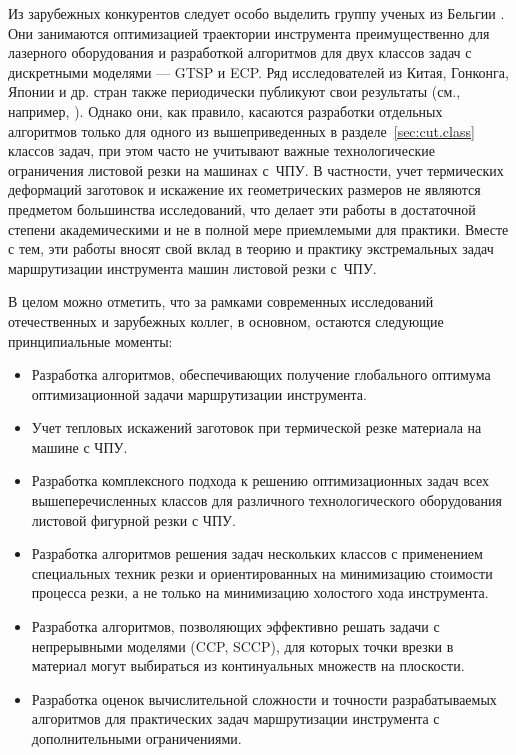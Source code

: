Из зарубежных конкурентов следует особо выделить группу ученых из Бельгии
\cite{bi:Dewil2014,bi:dewil-review,bi:Dewil2015Mar,bi:Dewil2015}.
Они занимаются
оптимизацией траектории инструмента преимущественно для лазерного оборудования и разработкой
алгоритмов для двух классов задач с дискретными моделями ---
GTSP и ECP.
Ряд исследователей из Китая, Гонконга,
Японии и др. стран также периодически публикуют свои результаты
(см., например,
\cite{bi:Kandasamy2020Mar,bi:Li2020Feb,bi:Vicencio,bi:Helsgaun2015Sep,bi:Ezzat2014Mar,bi:Ye2013,bi:Yun2013May,bi:VijayAnand2015Feb}).
Однако они, как правило,
касаются разработки отдельных алгоритмов только для одного из вышеприведенных в
разделе~\ref{sec:cut.class}
классов задач, при этом часто не учитывают важные технологические
ограничения листовой резки на машинах с~ЧПУ.
В частности, учет термических деформаций заготовок и искажение их
геометрических размеров не являются предметом большинства исследований,
что делает эти работы в достаточной степени академическими
и не в полной мере приемлемыми для практики.
Вместе с тем, эти работы вносят свой вклад в теорию и практику
экстремальных задач маршрутизации инструмента машин листовой резки с~ЧПУ.

В целом  можно отметить,
что за рамками современных исследований отечественных и зарубежных коллег,
в основном, остаются следующие принципиальные моменты:
\begin{itemize}
  \item
  Разработка алгоритмов, обеспечивающих получение глобального оптимума оптимизационной задачи маршрутизации инструмента.
  \item
  Учет тепловых искажений заготовок при термической резке материала на машине с ЧПУ.
  \item
  Разработка комплексного подхода к решению оптимизационных задач
  всех вышеперечисленных классов для различного технологического оборудования листовой фигурной резки с ЧПУ.
  \item
  Разработка алгоритмов решения задач нескольких классов
  с применением специальных техник резки и ориентированных на минимизацию стоимости процесса резки,
  а не только на минимизацию холостого хода инструмента.
  \item
  Разработка алгоритмов,
  позволяющих эффективно решать задачи с непрерывными моделями
  (CCP, SCCP),
  для которых точки врезки в материал могут выбираться из континуальных множеств на плоскости.
  \item
  Разработка оценок вычислительной сложности и точности
  разрабатываемых алгоритмов для практических задач маршрутизации инструмента
  с дополнительными ограничениями.
\end{itemize}

